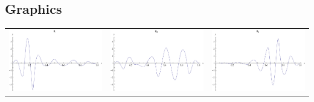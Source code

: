 \documentclass{article}
\begin{document}
\begin{landscape}
\subsection{Graphics}
\begin{tabular}{ccc}
\includegraphics[width=6.7cm]{biquadratic_wavelet_1.pdf}& \includegraphics[width=6.7cm]{biquadratic_wavelet_2.pdf}& \includegraphics[width=6.7cm]{biquadratic_wavelet_3.pdf} \\

\end{tabular}
\end{landscape}
\end{document}
